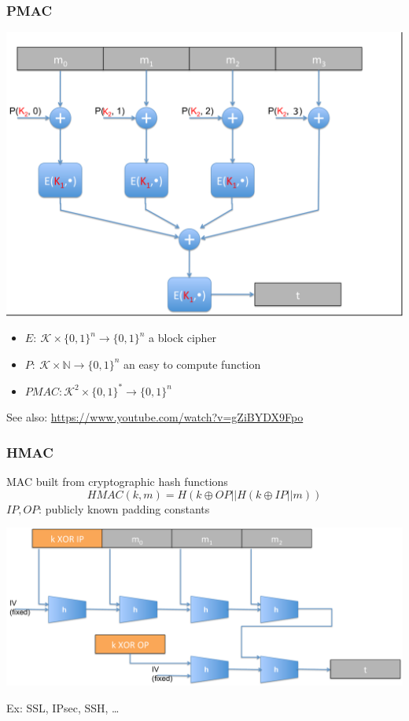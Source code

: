 \documentclass[aspectratio=169, lualatex, handout, 10pt,dvipsnames,svgnames]{beamer} %
\def\engris#1{\textcolor{gris}{#1}}
\def\envert#1{\textcolor{vert}{#1}}
\newcommand{\Kcal}{\mathcal{K}}
\begin{document}
\begin{frame}

  \frametitle{PMAC}

  \vspace{-1.2cm}
  \begin{center}
    \includegraphics[scale=0.32]{Images/PMAC.pdf}
  \end{center}


  \begin{itemize}
  \item $E:\ \Kcal\times \{0, 1\}^n\rightarrow \{0, 1\}^n$ a block cipher
  \item $P:\ \Kcal\times \mathbb N\rightarrow \{0, 1\}^n$ an easy to compute function
  \item $PMAC: \Kcal^2\times \{0, 1\}^*\rightarrow \{0, 1\}^n$
  \end{itemize}
  \engris{See also: \url{https://www.youtube.com/watch?v=gZiBYDX9Fpo}}
\end{frame}

\begin{frame}

  \frametitle{HMAC}
\vspace{-0.4cm}
    MAC built from cryptographic hash functions
    \[
    HMAC(k, m) = H(k\oplus OP ||H(k\oplus IP||m))
    \]
    $IP, OP$: publicly known padding constants
    \bigskip{}
    
    \begin{center}
      \includegraphics[scale=0.3]{Images/HMAC.pdf}
    \end{center}

    
  \envert{Ex: SSL, IPsec, SSH, \dots}

\end{frame}
\end{document}
